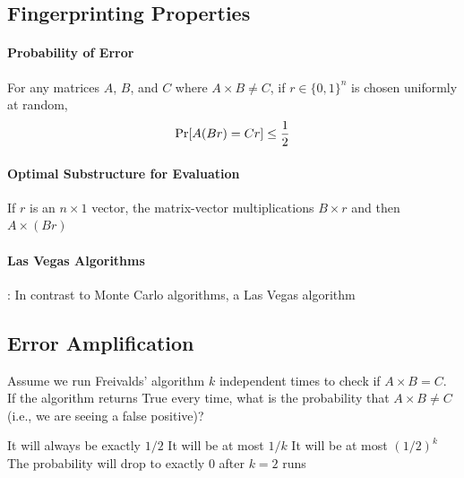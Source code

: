 \documentclass[11pt]{exam}
\begin{document}
	\newpage
	
	
	\subsection{Fingerprinting Properties}
	
	\paragraph{Probability of Error}
	For any matrices $A$, $B$, and $C$ where $A \times B \neq C$, if $r \in \{0,1\}^n$ is chosen uniformly at random,
	\begin{equation*}
		\text{Pr}[A(Br) = Cr] \leq \frac{1}{2} \\
	\end{equation*}
	
	\paragraph{Optimal Substructure for Evaluation}
	\begin{lemma} If $r$ is an $n \times 1$ vector, the matrix-vector multiplications $B \times r$ and then $A \times (Br)$ 
	\end{lemma}
	
	\vs{5cm}
	
	\paragraph{Las Vegas Algorithms}
	\begin{lemma}: In contrast to Monte Carlo algorithms, a Las Vegas algorithm %
	\end{lemma}
	\vs{2cm}
	
	
	\newpage
	
	\subsection{Error Amplification}
	\begin{Qu}
		Assume we run Freivalds' algorithm $k$ independent times to check if $A \times B = C$. If the algorithm returns True every time, what is the probability that $A \times B \neq C$ (i.e., we are seeing a false positive)?
		\begin{itemize}
			\aitem It will always be exactly $1/2$
			\bitem It will be at most $1/k$
			\citem It will be at most $(1/2)^k$
			\ditem The probability will drop to exactly 0 after $k=2$ runs
		\end{itemize}
	\end{Qu}
	\vs{5cm}
	
\end{document}
